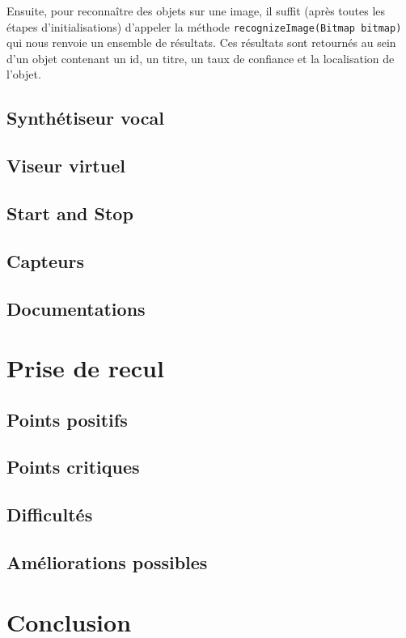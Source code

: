 \documentclass[UTF8]{EPURapport}
\begin{document}
Ensuite, pour reconnaître des objets sur une image, il suffit (après toutes les étapes d'initialisations) d'appeler la méthode \verb|recognizeImage(Bitmap bitmap)| qui nous renvoie un ensemble de résultats. Ces résultats sont retournés au sein d'un objet contenant un id, un titre, un taux de confiance et la localisation de l'objet.

\section{Synthétiseur vocal}

\section{Viseur virtuel}

\section{Start and Stop}

\section{Capteurs}

\section{Documentations}

\chapter{Prise de recul}

\section{Points positifs}

\section{Points critiques}

\section{Difficultés}

\section{Améliorations possibles}

\chapter{Conclusion}

\annexes
\end{document}
